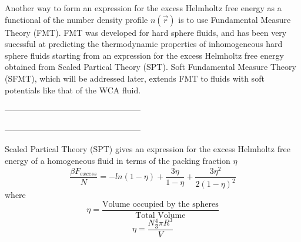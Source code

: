 \documentclass[12pt]{article}
\begin{document}

Another way to form an expression for the excess Helmholtz free energy as a functional of the number density profile $n(\vec r)$ is to use Fundamental Measure Theory (FMT). FMT was developed for hard sphere fluids, and has been very sucessful at predicting the thermodynamic properties of inhomogeneous hard sphere fluids starting from an expression for the excess Helmholtz free energy obtained from Scaled Partical Theory (SPT). Soft Fundamental Measure Theory (SFMT), which will be addressed later, extends FMT to fluids with soft potentials like that of the WCA fluid. 

--------------------------------------------------

--------------------------------------------------

Scaled Partical Theory (SPT) gives an expression for the excess Helmholtz free energy of a homogeneous fluid in terms of the packing fraction $\eta$ 
\begin{equation}\label{SPT_FE}{\frac{\beta{F_{excess}}}{N}=-ln(1-\eta)+\frac{3\eta}{1-\eta}+\frac{3{\eta}^2}{2(1-\eta)^2}}\end{equation} 
where
\begin{equation}{\eta = \frac{\mbox{Volume occupied by the spheres}}{\mbox{Total Volume}}}\end{equation}
\begin{equation}{\eta = \frac{N\frac{4}{3}\pi{R^3}}{V}}\end{equation}
\end{document}
